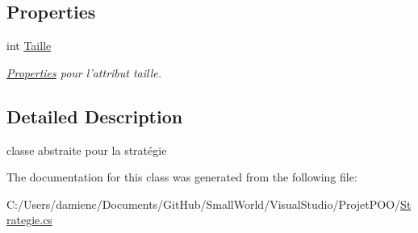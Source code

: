 \subsection*{Properties}
\begin{DoxyCompactItemize}
\item 
\hypertarget{class_small_world_1_1_strategie_carte_ac0c543aa988e3c669cf5d9b17ea3cd31}{int \hyperlink{class_small_world_1_1_strategie_carte_ac0c543aa988e3c669cf5d9b17ea3cd31}{Taille}}\label{class_small_world_1_1_strategie_carte_ac0c543aa988e3c669cf5d9b17ea3cd31}

\begin{DoxyCompactList}\small\item\em \hyperlink{namespace_small_world_1_1_properties}{Properties} pour l'attribut taille. \end{DoxyCompactList}\end{DoxyCompactItemize}


\subsection{Detailed Description}
classe abstraite pour la stratégie 

The documentation for this class was generated from the following file\-:\begin{DoxyCompactItemize}
\item 
C\-:/\-Users/damienc/\-Documents/\-Git\-Hub/\-Small\-World/\-Visual\-Studio/\-Projet\-P\-O\-O/\hyperlink{_strategie_8cs}{Strategie.\-cs}\end{DoxyCompactItemize}
